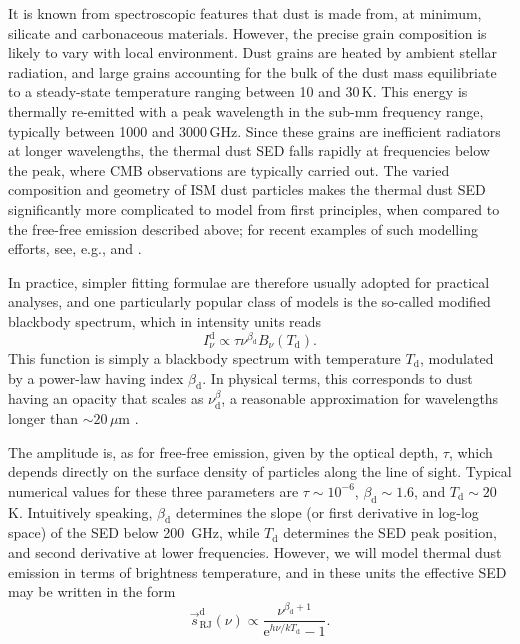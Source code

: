 \documentclass[onecolumn]{aa}
\newcommand{\s}[0]{\vec{s}}
\newcommand{\e}{\mathrm e}
\begin{document}
It is known from spectroscopic features that dust is made from, at
minimum, silicate and carbonaceous materials. However, the precise
grain composition is likely to vary with local environment. Dust
grains are heated by ambient stellar radiation, and large grains
accounting for the bulk of the dust mass equilibriate to a
steady-state temperature ranging between 10 and 30\,K. This energy is
thermally re-emitted with a peak wavelength in the sub-mm frequency
range, typically between 1000 and 3000\,GHz. Since these grains are
inefficient radiators at longer wavelengths, the thermal dust SED
falls rapidly at frequencies below the peak, where CMB observations
are typically carried out.  The varied composition and geometry of ISM
dust particles makes the thermal dust SED significantly more
complicated to model from first principles, when compared to the
free-free emission described above; for recent examples of such
modelling efforts, see, e.g., \citet{guillet2018} and
\citet{Hensley2022}.

In practice, simpler fitting formulae are
therefore usually adopted for practical analyses, and one particularly
popular class of models is the so-called modified blackbody
spectrum, which in intensity units reads
\begin{equation}
I^{\mathrm{d}}_{\nu} \propto \tau \nu^{\beta_{\mathrm{d}}} B_{\nu}(T_{\mathrm{d}}).
\end{equation}
This function is simply a blackbody spectrum with temperature
$T_{\mathrm{d}}$, modulated by a power-law having index
$\beta_{\mathrm{d}}$. In physical terms, this corresponds to dust having
an opacity that scales as $\nu^\beta_{\mathrm{d}}$, a reasonable approximation
for wavelengths longer than $\sim20\,\mu$m \citep{Hensley2020}.

The amplitude is, as for free-free emission,
given by the optical depth, $\tau$, which depends directly on the
surface density of particles along the line of sight. Typical
numerical values for these three parameters are $\tau \sim 10^{-6}$, 
$\beta_{\mathrm{d}}\sim 1.6$, and
$T_{\mathrm{d}}\sim20\,$K. Intuitively speaking, $\beta_{\mathrm{d}}$
determines the slope (or first derivative in log-log space)
of the SED below 200~GHz, while $T_{\mathrm{d}}$ determines the SED
peak position, and second derivative at lower frequencies. However, we
will model thermal dust emission in terms of brightness
temperature, and in these units the effective SED may be written in
the form
\begin{equation}
\s^{\mathrm{d}}_{\mathrm{RJ}}(\nu) \propto
\frac{\nu^{\beta_{\mathrm{d}}+1}}{\e^{h\nu/kT_{\mathrm{d}}}-1}. 
\end{equation}
\end{document}
